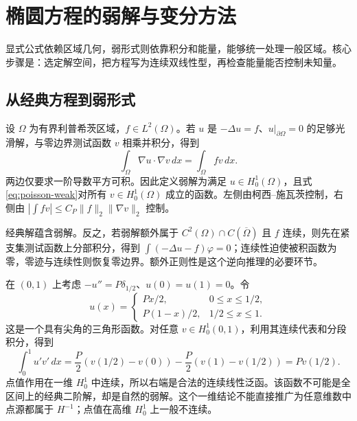 \setcounter{chapter}{13} %
\chapter{椭圆方程的弱解与变分方法}
\label{chap:elliptic-weak}

显式公式依赖区域几何，弱形式则依靠积分和能量，能够统一处理一般区域。核心步骤是：选定解空间，把方程写为连续双线性型，再检查能量能否控制未知量。

\section{从经典方程到弱形式}
设 $\Omega$ 为有界利普希茨区域，$f\in L^2(\Omega)$。若 $u$ 是 $-\Delta u=f$、$u|_{\partial\Omega}=0$ 的足够光滑解，与零边界测试函数 $v$ 相乘并积分，得到
\begin{equation}
 \int_\Omega\nabla u\cdot\nabla v\,dx=\int_\Omega fv\,dx.
 \label{eq:poisson-weak}
\end{equation}
两边仅要求一阶导数平方可积。因此定义弱解为满足 $u\in H_0^1(\Omega)$，且式\eqref{eq:poisson-weak}对所有 $v\in H_0^1(\Omega)$ 成立的函数。左侧由柯西--施瓦茨控制，右侧由 $|\int fv|\le C_P\|f\|_2\|\nabla v\|_2$ 控制。

经典解蕴含弱解。反之，若弱解额外属于 $C^2(\Omega)\cap C(\overline\Omega)$ 且 $f$ 连续，则先在紧支集测试函数上分部积分，得到 $\int(-\Delta u-f)\varphi=0$；连续性迫使被积函数为零，零迹与连续性则恢复零边界。额外正则性是这个逆向推理的必要环节。

\begin{example}[集中载荷的弱解]
在 $(0,1)$ 上考虑 $-u''=P\delta_{1/2}$、$u(0)=u(1)=0$。令
\[
 u(x)=\begin{cases}Px/2,&0\le x\le1/2,\\P(1-x)/2,&1/2\le x\le1.\end{cases}
\]
这是一个具有尖角的三角形函数。对任意 $v\in H_0^1(0,1)$，利用其连续代表和分段积分，得到
\[
 \int_0^1u'v'\,dx
 =\frac P2(v(1/2)-v(0))-\frac P2(v(1)-v(1/2))=Pv(1/2).
\]
点值作用在一维 $H_0^1$ 中连续，所以右端是合法的连续线性泛函。该函数不可能是全区间上的经典二阶解，却是自然的弱解。这个一维结论不能直接推广为任意维数中点源都属于 $H^{-1}$；点值在高维 $H_0^1$ 上一般不连续。
\end{example}

